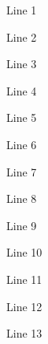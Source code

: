 Line  1 \par
Line  2 \par
Line  3 \par
Line  4 \par
Line  5 \par
Line  6 \par
Line  7 \par
Line  8 \par
Line  9 \par
Line 10 \par
Line 11 \par
Line 12 \par
Line 13
